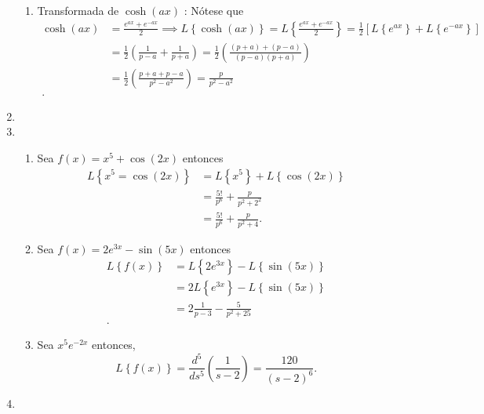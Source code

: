 \documentclass[12pt]{exam}
\begin{document}
\begin{enumerate}
\begin{enumerate}
  \item Transformada de $\cosh\left( ax \right) $ : Nótese que
    \begin{align*}
      \cosh\left( ax \right) &= \frac{e^{ax} + e^{-ax}}{2}\implies L\left\{ \cosh\left( ax \right)  \right\} = L\left\{ \frac{e^{ax} + e^{-ax}}{2} \right\} = \frac{1}{2}\left[ L\left\{ e^{ax} \right\} + L\left\{ e^{-ax} \right\}  \right] \\
      &= \frac{1}{2}\left( \frac{1}{p - a} + \frac{1}{p + a} \right) = \frac{1}{2}\left( \frac{\left( p + a \right) + \left( p - a \right) }{\left( p - a \right) \left( p + a \right) } \right)  \\
      &= \frac{1}{2}\left( \frac{p + a + p - a}{p^2 - a^2} \right) = \frac{p}{p^2 - a^2} \\
    .\end{align*}
  \end{enumerate}
	\item 
	\item 
	  \begin{enumerate}
	    \item Sea $f\left( x \right) = x^{5} + \cos\left( 2x \right) $ entonces
	      \begin{align*}
	        L\left\{ x^{5} = \cos\left( 2x \right)  \right\} &= L\left\{ x^{5} \right\} + L\left\{ \cos\left( 2x \right)  \right\}  \\
		&= \frac{5!}{p^{6}} + \frac{p}{p^2 + 2^2} \\
		&= \frac{5!}{p^{6}} + \frac{p}{p^2 + 4}
	      .\end{align*}
	    \item Sea $f\left( x \right) = 2e^{3x} - \sin\left( 5x \right) $ entonces
	      \begin{align*}
	        L\left\{ f\left( x \right)  \right\}  &= L\left\{ 2e^{3x} \right\} - L\left\{ \sin\left( 5x \right)  \right\}  \\
		&= 2L\left\{ e^{3x} \right\} - L\left\{ \sin\left( 5x \right)  \right\}  \\
		&= 2 \frac{1}{p - 3} - \frac{5}{p^2 + 25} \\
	      .\end{align*}
	    \item Sea $x^{5}e^{-2x}$ entonces, \[
	    L\left\{ f\left( x \right)  \right\} = \frac{d^{5}}{ds^{5}}\left( \frac{1}{s - 2} \right) = \frac{120}{\left( s - 2 \right)^{6}}
	    .\] 
	  \end{enumerate}
	\item 
	  \begin{enumerate}

\end{enumerate}
\end{enumerate}
\end{document}
